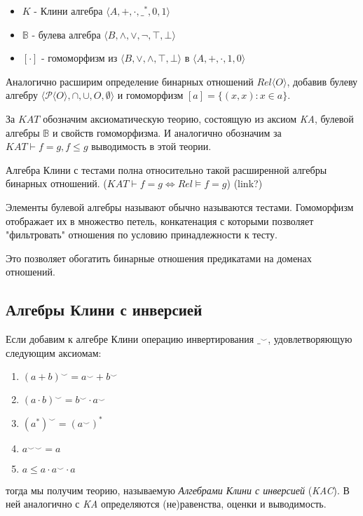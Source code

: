 \documentclass[times
              ]{itmo-student-thesis}
\begin{document}
      \begin{itemize}
        \item $K$ - Клини алгебра $\langle A, +, \cdot, \_^*, 0, 1 \rangle $
        \item $\mathbb{B}$ - булева алгебра $\langle B, \wedge, \vee, \neg, \top, \bot \rangle $
        \item $[\cdot]$ - гомоморфизм из
          $\langle B, \vee, \wedge, \top, \bot \rangle$
        в $\langle A, +,     \cdot, 1,    0 \rangle$
      \end{itemize}

      Аналогично расширим определение бинарных отношений $Rel \langle O \rangle $, добавив булеву алгебру $\langle \mathcal{P}\langle O \rangle, \cap, \cup, O, \emptyset \rangle$ и гомоморфизм $ [a] = \{(x, x): x \in a\} $.

      За $ \mathit{KAT} $ обозначим аксиоматическую теорию, состоящую из аксиом \textit{KA}, булевой алгебры $ \mathbb{B}$ и свойств гомоморфизма. И аналогично обозначим за $ KAT \vdash f = g, f \leq g $ выводимость в этой теории.

      Алгебра Клини с тестами полна относительно такой расширенной алгебры бинарных отношений.
      ($\mathit{KAT} \vdash f = g \Leftrightarrow \mathit{Rel} \models f = g$) (link?)

      Элементы булевой алгебры называют обычно называются тестами.
      Гомоморфизм отображает их в множество петель, конкатенация с которыми позволяет "фильтровать" отношения по условию принадлежности к тесту.

      Это позволяет обогатить бинарные отношения предикатами на доменах отношений.

    \subsection{Алгебры Клини с инверсией}
      Если добавим к алгебре Клини операцию инвертирования $ \_^{\smile} $, удовлетворяющую следующим аксиомам:
      \begin{enumerate}
        \item $ (a + b)^{\smile} = a^{\smile} + b^{\smile} $
        \item $ (a \cdot b)^{\smile} = b^{\smile} \cdot a^{\smile} $
        \item $ (a^*)^{\smile} = (a^{\smile})^* $
        \item $ {a^{\smile}}^{\smile} = a $
        \item $ a \leq a \cdot a^{\smile} \cdot a $
      \end{enumerate}
    тогда мы получим теорию, называемую \textit{Алгебрами Клини с инверсией} (\textit{KAC}).
    В ней аналогично с \textit{KA} определяются (не)равенства, оценки и выводимость.
\end{document}
